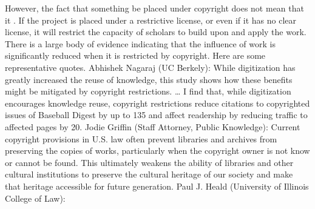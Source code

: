 {}However, the fact that something  be placed under copyright does not mean that it . If the project is placed under a restrictive license, or even if it has no clear license, it will restrict the capacity of scholars to build upon and apply the work. There is a large body of evidence indicating that the influence of work is significantly reduced when it is restricted by copyright. Here are some representative quotes.\markdownRendererInterblockSeparator
{}Abhishek Nagaraj (UC Berkely): \markdownRendererInterblockSeparator
{}\markdownRendererBlockQuoteBegin
While digitization has greatly increased the reuse of knowledge, this study shows how these benefits might be mitigated by copyright restrictions. … I find that, while digitization encourages knowledge reuse, copyright restrictions reduce citations to copyrighted issues of Baseball Digest by up to 135\markdownRendererPercentSign{} and affect readership by reducing traffic to affected pages by 20\markdownRendererPercentSign{}.
\markdownRendererBlockQuoteEnd \markdownRendererInterblockSeparator
{}Jodie Griffin (Staff Attorney, Public Knowledge): \markdownRendererInterblockSeparator
{}\markdownRendererBlockQuoteBegin
Current copyright provisions in U.S. law often prevent libraries and archives from preserving the copies of works, particularly when the copyright owner is not know or cannot be found. This ultimately weakens the ability of libraries and other cultural institutions to preserve the cultural heritage of our society and make that heritage accessible for future generation.
\markdownRendererBlockQuoteEnd \markdownRendererInterblockSeparator
{}Paul J. Heald (University of Illinois College of Law): \markdownRendererInterblockSeparator
